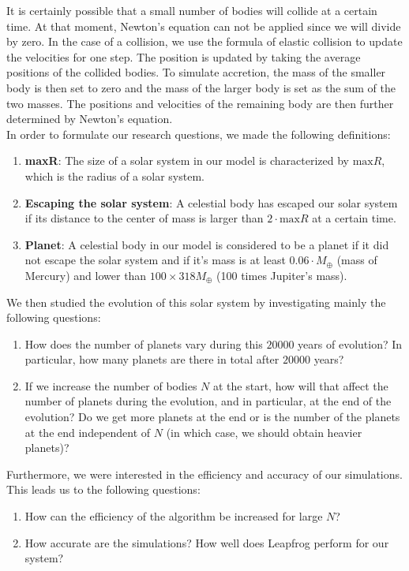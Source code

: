 It is certainly possible that a small number of bodies will collide at a certain time. 
At that moment, Newton's equation can not be applied since we will divide by zero. 
In the case of a collision, we use the formula of elastic collision to update the velocities for one step. The position is updated by taking the average positions of the collided bodies. 
To simulate accretion, the mass of the smaller body is then set to zero and the mass of the larger body is set as the sum of the two masses. 
The positions and velocities of the remaining body are then further determined by Newton's equation.\\

In order to formulate our research questions, we made the following definitions:\\
\begin{enumerate}
\item \textbf{maxR}: The size of a solar system in our model is characterized by $\text{max}R$, which is the radius of a solar system. 
\item \textbf{Escaping the solar system}: A celestial body has escaped our solar system if its distance to the center of mass is larger than $2\cdot\text{max}R$ at a certain time.
\item \textbf{Planet}: A celestial body in our model is considered to be a planet if it did not escape the solar system and if it's mass is at least $0.06\cdot M_{\oplus}$ (mass of Mercury) and lower than $100\times 318M_{\oplus}$ (100 times Jupiter's mass).
\end{enumerate}
We then studied the evolution of this solar system by investigating mainly the following questions:
\begin{enumerate}
	\item  How does the number of planets vary during this $20000$ years of evolution? In particular, how many planets are there in total after $20000$ years?
	
	\item  If we increase the number of bodies $N$ at the start, how will that affect the number of planets during the evolution, and in particular, at the end of the evolution? Do we get more planets at the end or is the number of the planets at the end independent of $N$ (in which case, we should obtain heavier planets)?   
\end{enumerate}
Furthermore, we were interested in the efficiency and accuracy of our simulations. This leads us to the following questions:
\begin{enumerate}
	\item How can the efficiency of the algorithm be increased for large $N$?
	
	\item How accurate are the simulations? How well does Leapfrog perform for our system?
\end{enumerate}


